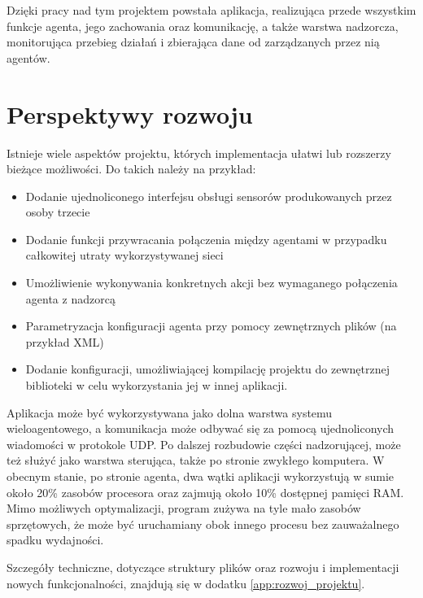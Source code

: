 Dzięki pracy nad tym projektem powstała aplikacja, realizująca przede wszystkim funkcje agenta, jego zachowania oraz komunikację, a także warstwa nadzorcza, monitorująca przebieg działań i zbierająca dane od zarządzanych przez nią agentów.

\section{Perspektywy rozwoju}

Istnieje wiele aspektów projektu, których implementacja ułatwi lub rozszerzy bieżące możliwości. Do takich należy na przykład:
\begin{itemize}
    \item Dodanie ujednoliconego interfejsu obsługi sensorów produkowanych przez osoby trzecie
    \item Dodanie funkcji przywracania połączenia między agentami w przypadku całkowitej utraty wykorzystywanej sieci
    \item Umożliwienie wykonywania konkretnych akcji bez wymaganego połączenia agenta z nadzorcą
    \item Parametryzacja konfiguracji agenta przy pomocy zewnętrznych plików (na przykład XML)
    \item Dodanie konfiguracji, umożliwiającej kompilację projektu do zewnętrznej biblioteki w celu wykorzystania jej w innej aplikacji.
\end{itemize}

Aplikacja może być wykorzystywana jako dolna warstwa systemu wieloagentowego, a komunikacja może odbywać się za pomocą ujednoliconych wiadomości w protokole UDP. Po dalszej rozbudowie części nadzorującej, może też służyć jako warstwa sterująca, także po stronie zwykłego komputera. W obecnym stanie, po stronie agenta, dwa wątki aplikacji wykorzystują w sumie około 20\% zasobów procesora oraz zajmują około 10\% dostępnej pamięci RAM. Mimo możliwych optymalizacji, program zużywa na tyle mało zasobów sprzętowych, że może być uruchamiany obok innego procesu bez zauważalnego spadku wydajności.

Szczegóły techniczne, dotyczące struktury plików oraz rozwoju i implementacji nowych funkcjonalności, znajdują się w dodatku \ref{app:rozwoj_projektu}.
